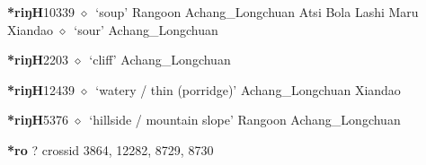   \begin{list}{}{\leftmargin=1.5em \itemindent=-1.5em}
  \item {\footnotesize \textbf{*riŋH}}{\tiny 10339}
         $\diamond$~`soup'
         Rangoon 
\hspace{1ex}
         Achang\_Longchuan 
\hspace{1ex}
         Atsi 
\hspace{1ex}
         Bola 
\hspace{1ex}
         Lashi 
\hspace{1ex}
         Maru 
\hspace{1ex}
         Xiandao 
\hspace{1ex}
         $\diamond$~`sour'
         Achang\_Longchuan 
  \item {\footnotesize \textbf{*riŋH}}{\tiny 2203}
\hspace{1ex}
         $\diamond$~`cliff'
         Achang\_Longchuan 
  \item {\footnotesize \textbf{*riŋH}}{\tiny 12439}
\hspace{1ex}
         $\diamond$~`watery / thin (porridge)'
         Achang\_Longchuan 
\hspace{1ex}
         Xiandao 
  \item {\footnotesize \textbf{*riŋH}}{\tiny 5376}
\hspace{1ex}
         $\diamond$~`hillside / mountain slope'
         Rangoon 
\hspace{1ex}
         Achang\_Longchuan 
  \end{list}
\item
\textbf{*ro}
?
  {\tiny crossid 3864, 12282, 8729, 8730}
